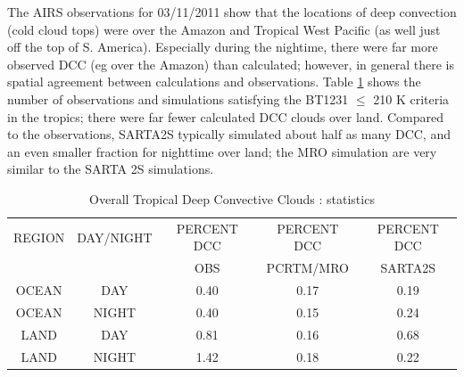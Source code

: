 \documentclass[agupp]{aguplus}              %
\begin{document}
\begin{article}
The AIRS observations for 03/11/2011 show that the locations of deep
convection (cold cloud tops) were over the Amazon and Tropical West
Pacific (as well just off the top of S. America). Especially during the
nightime, there were far more observed DCC (eg over the Amazon) than
calculated; however, in general there is spatial agreement between
calculations and observations.  Table \ref{table:dcc_stats} shows the
number of observations and simulations satisfying the BT1231 $\le$ 210
K criteria in the tropics; there were far fewer calculated DCC clouds
over land.  Compared to the observations, SARTA2S typically simulated
about half as many DCC, and an even smaller fraction for nighttime
over land; the MRO simulation are very similar to the SARTA 2S
simulations.

\begin{center}
\begin{table}[ht]
{\small
\hfill{}
\begin{tabular}{ccccc} %
\hline\hline %
  REGION    & DAY/NIGHT &  PERCENT DCC & PERCENT DCC & PERCENT DCC \\
            &           &     OBS      & PCRTM/MRO   & SARTA2S \\
\hline
OCEAN & DAY    &  0.40  &  0.17 &  0.19 \\
OCEAN & NIGHT  &  0.40  &  0.15 &  0.24 \\
LAND & DAY     &  0.81  &  0.16 &  0.68 \\
LAND & NIGHT   &  1.42  &  0.18 &  0.22 \\
\hline
\end{tabular}}
\hfill{}
\caption{Overall Tropical Deep Convective Clouds : statistics }
\label{table:dcc_stats} %
\end{table}
\end{center}




\end{article}
\end{document}
